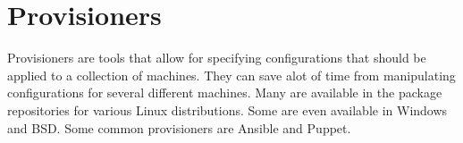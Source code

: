 \section{Provisioners}

Provisioners are tools that allow for specifying configurations that should be applied to a collection of machines.
They can save alot of time from manipulating configurations for several different machines.
Many are available in the package repositories for various Linux distributions.
Some are even available in Windows and BSD.
Some common provisioners are Ansible and Puppet.


